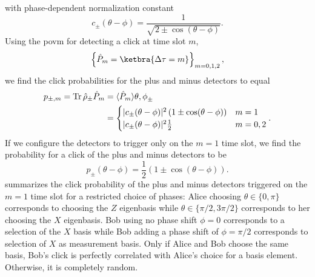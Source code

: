 with phase-dependent normalization constant
\begin{equation}
	c_\pm(\theta-\phi)
	=
	\frac{1}{\sqrt{2\pm\cos(\theta-\phi)}}
	.
\end{equation}
Using the \gls{povm} for detecting a click at time slot $m$,
\begin{equation}
	\left\{
		\hat{P}_m
		=
		\ketbra{\Delta\tau=m}
	\right\}_{m=0,1,2}
	,
\end{equation}
we find the click probabilities for the plus and minus detectors to equal
\begin{equation}
	\begin{split}
		p_{\pm,m}
		=
		\operatorname{Tr}{\hat\rho_\pm\hat{P}_m}
		&=
		\langle\hat{P}_m\rangle{\theta,\phi}_{\pm}
		\\
		&=
		\begin{cases}
			\lvert c_\pm(\theta-\phi)\rvert^2\left(1\pm\cos(\theta-\phi)\right) & m=1 \\
			\lvert c_\pm(\theta-\phi)\rvert^2\frac{1}{2} & m=0,2
		\end{cases}
		.
	\end{split}
\end{equation}
If we configure the detectors to trigger only on the $m=1$ time slot, we find the probability for a click of the plus and minus detectors to be
\begin{equation}
	p_\pm(\theta-\phi)
	=
	\frac{1}{2}
	\left(1\pm\cos(\theta-\phi)\right)
	.
\end{equation}
 summarizes the click probability of the plus and minus detectors triggered on the $m=1$ time slot for a restricted choice of phases:
Alice choosing $\theta\in\{0,\pi\}$ corresponds to choosing the $Z$ eigenbasis while $\theta\in\{\pi/2,3\pi/2\}$ corresponds to her choosing the $X$ eigenbasis. Bob using no phase shift $\phi=0$ corresponds to a selection of the $X$ basis while Bob adding a phase shift of $\phi=\pi/2$ corresponds to selection of $X$ as measurement basis. Only if Alice and Bob choose the same basis, Bob's click is perfectly correlated with Alice's choice for a basis element. Otherwise, it is completely random.
